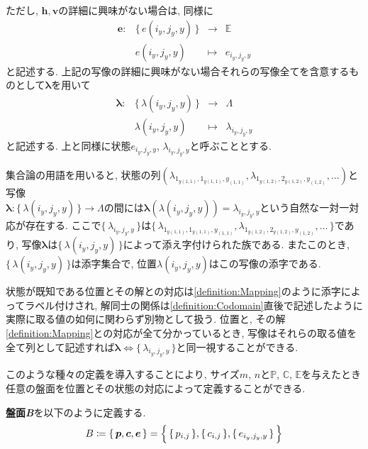 \begin{definition}[写像$\bm{p}$, $\bm{c}$, $\bm{h}$, $\bm{v}$]
  ただし, $\bm{h},\bm{v}$の詳細に興味がない場合は, 同様に
  \begin{equation}
    \begin{array}{rccc}
      \bm{e}\colon & \{\,e(i_y,j_y,y)\,\} & \longrightarrow & \mathbb{E}    \\
                   & e(i_y,j_y,y)         & \longmapsto     & e_{i_y,j_y,y}
    \end{array}
  \end{equation}
  と記述する. 上記の写像の詳細に興味がない場合それらの写像全てを含意するものとして$\bm{\lambda}$を用いて
  \begin{equation}
    \begin{array}{rccc}
      \bm{\lambda}\colon & \{\,\lambda(i_y,j_y,y)\,\} & \longrightarrow & \Lambda             \\
                         & \lambda(i_y,j_y,y)         & \longmapsto     & \lambda_{i_y,j_y,y}
    \end{array}
  \end{equation}
  と記述する. 上と同様に状態$e_{i_y,j_y,y}$, $\lambda_{i_y,j_y,y}$と呼ぶこととする.
\end{definition}
集合論の用語を用いると, 状態の列$(\lambda_{1_{y(1,1)},1_{y(1,1)},y_{(1,1)}}, \lambda_{1_{y(1,2)},2_{y(1,2)},y_{(1,2)}},\ldots)$と写像\\
$\bm{\lambda}\colon \{\,\lambda(i_y,j_y,y)\,\} \longrightarrow \Lambda$の間には$\bm{\lambda}(\lambda(i_y,j_y,y))=\lambda_{i_y,j_y,y}$という自然な一対一対応が存在する.
ここで$\{\,\lambda_{i_y,j_y,y}\,\}$は$\{\,\lambda_{1_{y(1,1)},1_{y(1,1)},y_{(1,1)}}, \lambda_{1_{y(1,2)},2_{y(1,2)},y_{(1,2)}},\ldots\,\}$であり, 写像$\bm{\lambda}$は$\{\,\lambda(i_y,j_y,y)\,\}$によって添え字付けられた族である. またこのとき, $\{\,\lambda(i_y,j_y,y)\,\}$は添字集合で, 位置$\lambda(i_y,j_y,y)$はこの写像の添字である.

状態が既知である位置とその解との対応は\cref{definition:Mapping}のように添字によってラベル付けされ, 解同士の関係は\cref{definition:Codomain}直後で記述したように実際に取る値の如何に関わらず別物として扱う.
位置と, その解\cref{definition:Mapping}との対応が全て分かっているとき, 写像はそれらの取る値を全て列として記述すれば$\bm{\lambda}\Leftrightarrow \{\,\lambda_{i_y,j_y,y}\,\}$と同一視することができる.

このような種々の定義を導入することにより, サイズ$m$, $n$と$\mathbb{P}$, $\mathbb{C}$, $\mathbb{E}$を与えたとき任意の盤面を位置とその状態の対応によって定義することができる.
\begin{definition}[盤面\textit{B}]\label{definition:B}
  \textbf{盤面\textit{B}}を以下のように定義する.
  \begin{equation}
    B\coloneqq \{\,\bm{p},\bm{c},\bm{e}\,\}=\Bigl\{\,\{\,p_{i,j}\,\},\{\,c_{i,j}\,\},\{\,e_{i_y,j_y,y}\,\}\,\Bigr\}
  \end{equation}
\end{definition}

